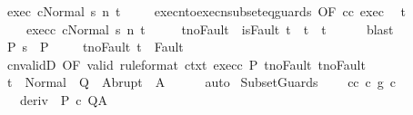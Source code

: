 \begin{isabellebody}
\ exec{\isacharcolon}\ {\isachardoublequoteopen}{\isasymGamma}{\isasymturnstile}{\isasymlangle}c{\isacharcomma}Normal\ s{\isasymrangle}\ {\isacharequal}n{\isasymRightarrow}\ t{\isachardoublequoteclose}\ \isanewline
\ \ \isamarkupfalse%
\ execn{\isacharunderscore}to{\isacharunderscore}execn{\isacharunderscore}subseteq{\isacharunderscore}guards\ {\isacharbrackleft}OF\ c{\isacharunderscore}c{\isacharprime}\ exec{\isacharbrackright}\ \isamarkupfalse%
\ t{\isacharprime}\ \isanewline
\ \ \ \ exec{\isacharunderscore}c{\isacharprime}{\isacharcolon}\ {\isachardoublequoteopen}{\isasymGamma}{\isasymturnstile}{\isasymlangle}c{\isacharprime}{\isacharcomma}Normal\ s{\isasymrangle}\ {\isacharequal}n{\isasymRightarrow}\ t{\isacharprime}{\isachardoublequoteclose}\ \isanewline
\ \ \ \ t{\isacharprime}{\isacharunderscore}noFault{\isacharcolon}\ {\isachardoublequoteopen}{\isasymnot}\ isFault\ t{\isacharprime}\ {\isasymlongrightarrow}\ t{\isacharprime}\ {\isacharequal}\ t{\isachardoublequoteclose}\isanewline
\ \ \ \ \isamarkupfalse%
\ blast\isanewline
\ \ \isamarkupfalse%
\ P{\isacharcolon}\ {\isachardoublequoteopen}s\ {\isasymin}\ P{\isachardoublequoteclose}\ \isanewline
\ \ \isamarkupfalse%
\ t{\isacharunderscore}noFault{\isacharcolon}\ {\isachardoublequoteopen}t\ {\isasymnotin}\ Fault\ {\isacharbackquote}\ {\isacharbraceleft}{\isacharbraceright}{\isachardoublequoteclose}\isanewline
\ \ \isamarkupfalse%
\ cnvalidD\ {\isacharbrackleft}OF\ valid\ {\isacharbrackleft}rule{\isacharunderscore}format{\isacharbrackright}\ ctxt\ exec{\isacharunderscore}c{\isacharprime}\ P{\isacharbrackright}\ t{\isacharprime}{\isacharunderscore}noFault\ t{\isacharunderscore}noFault\isanewline
\ \ \isamarkupfalse%
\ {\isachardoublequoteopen}t\ {\isasymin}\ Normal\ {\isacharbackquote}\ Q\ {\isasymunion}\ Abrupt\ {\isacharbackquote}\ A{\isachardoublequoteclose}\isanewline
\ \ \ \ \isamarkupfalse%
\ auto\isanewline
{}\isamarkupfalse%
%
\endisatagproof
{\isafoldproof}%
%
\isadelimproof
\isanewline
%
\endisadelimproof
\isanewline
{}\isamarkupfalse%
\ SubsetGuards{\isacharcolon}\ \isanewline
\ \ \ c{\isacharunderscore}c{\isacharprime}{\isacharcolon}\ {\isachardoublequoteopen}c\ {\isasymsubseteq}\isactrlsub g\ c{\isacharprime}{\isachardoublequoteclose}\isanewline
\ \ \ deriv{\isacharcolon}\ {\isachardoublequoteopen}{\isasymGamma}{\isacharcomma}{\isasymTheta}{\isasymturnstile}\isactrlbsub {\isacharslash}{\isacharbraceleft}{\isacharbraceright}\isactrlesub \ P\ c{\isacharprime}\ Q{\isacharcomma}A{\isachardoublequoteclose}\isanewline

\end{isabellebody}
